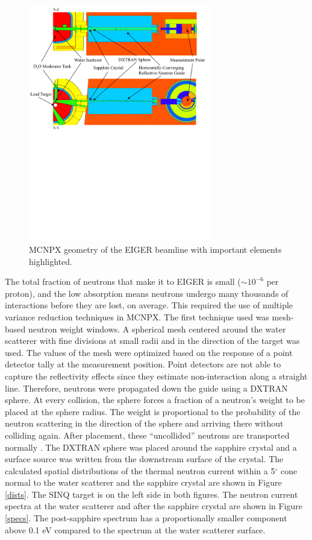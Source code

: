\documentclass[a4paper,
              ]{jacow}
\begin{document}
\begin{figure}[!htb]
   \centering
   \includegraphics*[trim = 2mm 130mm 5mm 2mm, width=80mm]{THPF102f2.pdf}
   \caption{MCNPX geometry of the EIGER beamline with important elements highlighted.}
   \label{geom}
\end{figure}

The total fraction of neutrons that make it to EIGER is small ($\sim 10^{-6}$ per proton), and the low absorption means neutrons undergo many thousands of interactions before they are lost, on average.  This required the use of multiple variance reduction techniques in MCNPX.  The first technique used was mesh-based neutron weight windows.  A spherical mesh centered around the water scatterer with fine divisions at small radii and in the direction of the target was used.  The values of the mesh were optimized based on the response of a point detector tally at the measurement position.  Point detectors are not able to capture the reflectivity effects since they estimate non-interaction along a straight line.  Therefore, neutrons were propagated down the guide using a DXTRAN sphere.  At every collision, the sphere forces a fraction of a neutron's weight to be placed at the sphere radius.  The weight is proportional to the probability of the neutron scattering in the direction of the sphere and arriving there without colliding again.  After placement, these ``uncollided'' neutrons are transported normally \cite{mcnpx270}.  The DXTRAN sphere was placed around the sapphire crystal and a surface source was written from the downstream surface of the crystal.  The calculated spatial distributions of the thermal neutron current within a 5$^\circ$ cone normal to the water scatterer and the sapphire crystal are shown in Figure \ref{dists}.  The SINQ target is on the left side in both figures.  The neutron current spectra at the water scatterer and after the sapphire crystal are shown in Figure \ref{specs}.  The post-sapphire spectrum has a proportionally smaller component above 0.1 eV compared to the spectrum at the water scatterer surface.
\end{document}
